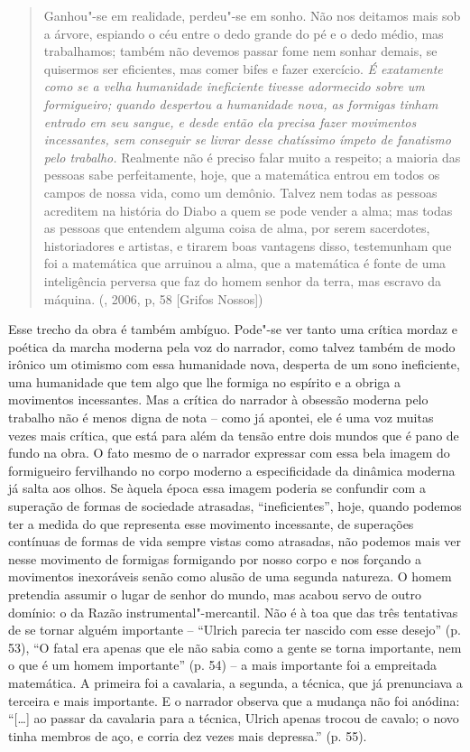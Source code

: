 \begin{quote}
Ganhou"-se em realidade, perdeu"-se em sonho. Não nos deitamos mais sob a
árvore, espiando o céu entre o dedo grande do pé e o dedo médio, mas
trabalhamos; também não devemos passar fome nem sonhar demais, se
quisermos ser eficientes, mas comer bifes e fazer exercício. \emph{É
exatamente como se a velha humanidade ineficiente tivesse adormecido
sobre um formigueiro; quando despertou a humanidade nova, as formigas
tinham entrado em seu sangue, e desde então ela precisa fazer movimentos
incessantes, sem conseguir se livrar desse chatíssimo ímpeto de
fanatismo pelo trabalho.} Realmente não é preciso falar muito a
respeito; a maioria das pessoas sabe perfeitamente, hoje, que a
matemática entrou em todos os campos de nossa vida, como um demônio.
Talvez nem todas as pessoas acreditem na história do Diabo a quem se
pode vender a alma; mas todas as pessoas que entendem alguma coisa de
alma, por serem sacerdotes, historiadores e artistas, e tirarem boas
vantagens disso, testemunham que foi a matemática que arruinou a alma,
que a matemática é fonte de uma inteligência perversa que faz do homem
senhor da terra, mas escravo da máquina. (, 2006, p, 58 [Grifos
Nossos])
\end{quote}

Esse trecho da obra é também ambíguo. Pode"-se ver tanto uma crítica
mordaz e poética da marcha moderna pela voz do narrador, como talvez
também de modo irônico um otimismo com essa humanidade nova, desperta de
um sono ineficiente, uma humanidade que tem algo que lhe formiga no
espírito e a obriga a movimentos incessantes. Mas a crítica do narrador
à obsessão moderna pelo trabalho não é menos digna de nota -- como já
apontei, ele é uma voz muitas vezes mais crítica, que está para além da
tensão entre dois mundos que é pano de fundo na obra. O fato mesmo de o
narrador expressar com essa bela imagem do formigueiro fervilhando no
corpo moderno a especificidade da dinâmica moderna já salta aos olhos.
Se àquela época essa imagem poderia se confundir com a superação de
formas de sociedade atrasadas, ``ineficientes'', hoje, quando podemos
ter a medida do que representa esse movimento incessante, de superações
contínuas de formas de vida sempre vistas como atrasadas, não podemos
mais ver nesse movimento de formigas formigando por nosso corpo e nos
forçando a movimentos inexoráveis senão como alusão de uma segunda
natureza. O homem pretendia assumir o lugar de senhor do mundo, mas
acabou servo de outro domínio: o da Razão instrumental"-mercantil. Não é
à toa que das três tentativas de se tornar alguém importante -- ``Ulrich
parecia ter nascido com esse desejo'' (p. 53), ``O fatal era apenas que
ele não sabia como a gente se torna importante, nem o que é um homem
importante'' (p. 54) -- a mais importante foi a empreitada matemática. A
primeira foi a cavalaria, a segunda, a técnica, que já prenunciava a
terceira e mais importante. E o narrador observa que a mudança não foi
anódina: ``[\ldots{}] ao passar da cavalaria para a técnica, Ulrich
apenas trocou de cavalo; o novo tinha membros de aço, e corria dez vezes
mais depressa.'' (p. 55).

